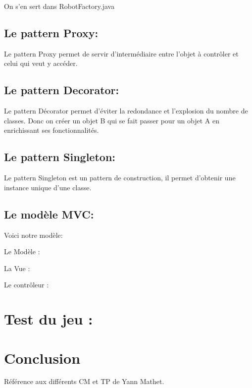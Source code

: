 \documentclass{article}
\begin{document}
On s'en sert dans RobotFactory.java


\subsection{Le pattern Proxy:}

Le pattern Proxy permet de servir d'intermédiaire entre l'objet à contrôler et celui qui veut y accéder. 

\subsection{Le pattern Decorator:}

Le pattern Décorator permet d'éviter la redondance et l'explosion du nombre de classes. Donc on créer un objet B qui se fait passer pour un objet A en enrichissant ses fonctionnalités.

\subsection{Le pattern Singleton:}

Le pattern Singleton est un pattern de construction, il permet d'obtenir une instance unique d'une classe.

\subsection{Le modèle MVC:}

Voici notre modèle:

\vspace{1\baselineskip}

Le Modèle :

La Vue :

Le contrôleur :


\section{Test du jeu :}

\section{Conclusion}







\vspace{1\baselineskip}

Référence aux différents CM et TP de Yann Mathet.
\end{document}
